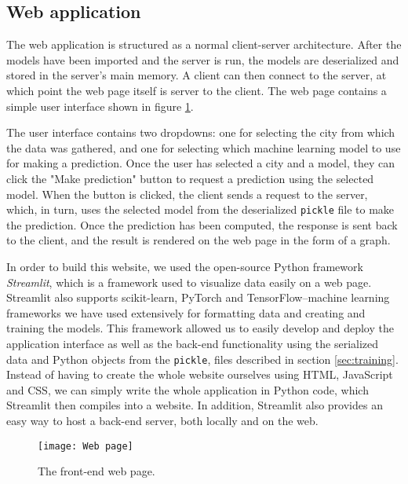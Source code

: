 \subsection{Web application}
The web application is structured as a normal client-server architecture. After the models have been imported and the server is run, the models are deserialized and stored in the server's main memory.
A client can then connect to the server, at which point the web page itself is server to the client.
The web page contains a simple user interface shown in figure \ref{fig:web page}.

The user interface contains two dropdowns: one for selecting the city from which the data was gathered, and one for selecting which machine learning model to use for making a prediction.
Once the user has selected a city and a model, they can click the "Make prediction" button to request a prediction using the selected model.
When the button is clicked, the client sends a request to the server, which, in turn, uses the selected model from the deserialized \texttt{pickle} file to make the prediction. 
Once the prediction has been computed, the response is sent back to the client, and the result is rendered on the web page in the form of a graph.

In order to build this website, we used the open-source Python framework \textit{Streamlit}\cite{streamlit}, which is a framework used to visualize data easily on a web page.
Streamlit also supports scikit-learn\cite{scikit-learn}, PyTorch\cite{pytorch} and TensorFlow\cite{tensorflow}--machine learning frameworks we have used extensively for formatting data and creating and training the models.
This framework allowed us to easily develop and deploy the application interface as well as the back-end functionality using the serialized data and Python objects from the \texttt{pickle}, files described in section \ref{sec:training}.
Instead of having to create the whole website ourselves using HTML, JavaScript and CSS, we can simply write the whole application in Python code, which Streamlit then compiles into a website.
In addition, Streamlit also provides an easy way to host a back-end server, both locally and on the web.

\begin{figure}[h]
	\centering
	\texttt{[image: Web page]}
	\caption{The front-end web page.}
	\label{fig:web page}
\end{figure}

